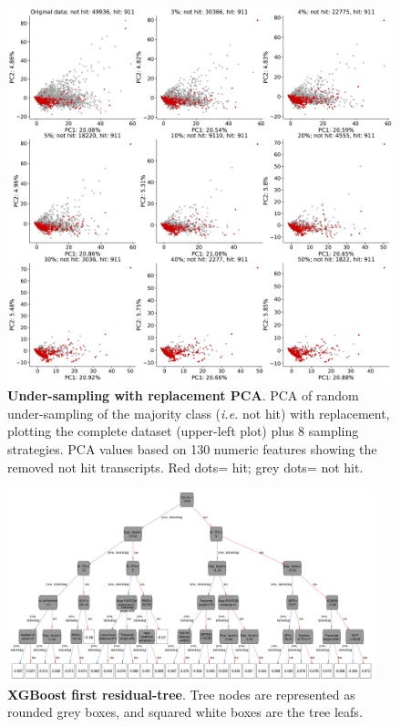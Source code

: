 \begin{figure}[ht!]
  \centering
  \includegraphics[scale=0.3]{plots/appendix/ml/pca.random.us.with.replacement.pdf}
  \caption[Under-sampling with replacement PCA]{\textbf{Under-sampling with replacement PCA}. PCA of random under-sampling of the majority class (\textit{i.e.} not hit) with replacement, plotting the complete dataset (upper-left plot) plus 8 sampling strategies. PCA values based on 130 numeric features showing the removed not hit transcripts. Red dots= hit; grey dots= not hit.}
  \label{supp-fig:pca-under-sampling-with-r}
\end{figure}

\begin{figure}[!htb]
  \centering
  \includegraphics[width=0.95\textwidth]{plots/appendix/ml/first.residual.tree.png}
  \caption[XGBoost first residual-tree]{\textbf{XGBoost first residual-tree}. Tree nodes are represented as rounded grey boxes, and squared white boxes are the tree leafs.}
  \label{supp-fig:decision-tree}
\end{figure}

